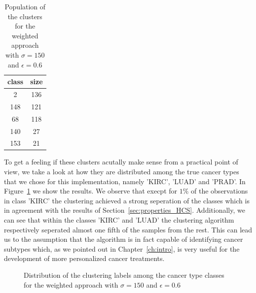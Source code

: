 \documentclass[paper=a4,fontsize=11pt,DIV=8,BCOR=5mm,twoside,pdftex,bibtotocnumbered]{scrreprt}
\theoremstyle{plain}
\begin{document}
 \begin{table}
 	\caption{Population of the clusters for the weighted approach with $\sigma=150$ and  $\epsilon=0.6$}
 	\centering
 	\begin{tabular}{|c|c|}
 		\hline
 		class & size \\
 		\hline
 		2 & 136 \\
 		148 & 121 \\
 		68 & 118 \\
 		140 & 27 \\
 		153 & 21 \\
 		\hline
 	\end{tabular}
 	\label{tab:pop_clusters_weighted}
 \end{table}
 
 To get a feeling if these clusters acutally make sense from a practical point of view, we take a look at how they are distributed among the true cancer types that we chose for this implementation, namely 'KIRC', 'LUAD' and 'PRAD'. In Figure~\ref{chart:distr_clustering_labels} we show the results. We observe that execpt for $1\%$ of the observations in class 'KIRC' the clustering achieved a strong seperation of the classes which is in agreement with the results of Section~\ref{sec:properties_HCS}. Additionally, we can see that within the classes 'KIRC' and 'LUAD' the clustering algorithm respectively seperated almost one fifth of the samples from the rest. This can lead us to the assumption that the algorithm is in fact capable of identifying cancer subtypes which, as we pointed out in Chapter~\ref{ch:intro}, is very useful for the development of more personalized cancer treatments.

\begin{figure}
	\caption{Distribution of the clustering labels among the cancer type classes for the weighted approach with $\sigma=150$ and  $\epsilon=0.6$}
	\centering
	\label{chart:distr_clustering_labels}
\end{figure}
\end{document}
